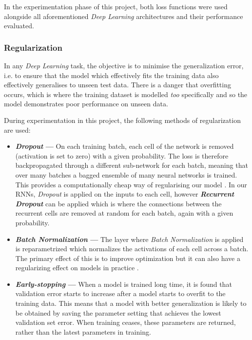 \documentclass[12pt,a4paper]{article}
\begin{document}
	In the experimentation phase of this project, both loss functions were used alongside all aforementioned \textit{Deep Learning} architectures and their performance evaluated.
	
	\subsubsection{Regularization}
	In any \textit{Deep Learning} task, the objective is to minimise the generalization error, i.e. to ensure that the model which effectively fits the training data also effectively generalises to unseen test data. There is a danger that overfitting occurs, which is where the training dataset is modelled \textit{too} specifically and so the model demonstrates poor performance on unseen data. 
	
	During experimentation in this project, the following methods of regularization are used:
	\begin{itemize}
		\item \textbf{\textit{Dropout} --- }On each training batch, each cell of the network is removed (activation is set to zero) with a given probability. The loss is therefore backpropagated through a different sub-network for each batch, meaning that over many batches a bagged ensemble of many neural networks is trained. This provides a computationally cheap way of regularising our model \cite[p.273]{DL}. In our RNNs, \textit{Dropout} is applied on the inputs to each cell, however \textbf{\textit{Recurrent Dropout}} can be applied which is where the connections between the recurrent cells are removed at random for each batch, again with a given probability.
		\item \textbf{\textit{Batch Normalization} --- }The layer where \textit{Batch Normalization} is applied is reparametrized which normalizes the activations of each cell across a batch. The primary effect of this is to improve optimization but it can also have a regularizing effect on models in practice \cite[p.1]{Sergey}. 
		\item \textbf{\textit{Early-stopping} --- }When a model is trained long time, it is found that validation error starts to increase after a model starts to overfit to the training data. This means that a model with better generalization is likely to be obtained by saving the parameter setting that achieves the lowest validation set error. When training ceases, these parameters are returned, rather than the latest parameters in training.
	\end{itemize}
\end{document}
